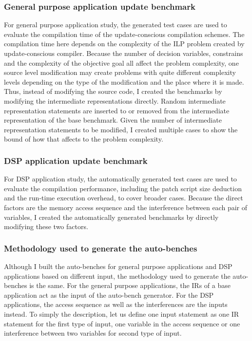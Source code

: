 \subsubsection{General purpose application update benchmark}
For general purpose application study, 
the generated test cases are used to evaluate the compilation time of the update-conscious compilation schemes. The 
compilation time here depends on the complexity of the
ILP problem created by update-conscious compiler.  
Because the number of decision variables, constrains and the complexity of
the objective goal all affect the problem complexity, one source level modification may create problems with
quite different complexity levels depending on the type of the modification
and the place where it is made. 
Thus, instead of modifying the source code, I created the benchmarks
by modifying the intermediate representations directly.
Random intermediate representation statements are inserted to or removed from the 
intermediate representation of the base benchmark.
Given the number of intermediate representation statements to be modified,
I created multiple cases to show the bound of how that affects to the problem complexity.

\subsubsection{DSP application update benchmark}
For DSP application study, the automatically generated test cases are used to evaluate
the compilation performance, including the patch script size deduction and
the run-time execution overhead, to cover broader cases.
Because the direct factors are the memory access sequence and the interference
between each pair of variables, I created the automatically generated 
benchmarks by directly modifying these two factors.

\subsubsection{Methodology used to generate the auto-benches}
Although I built the auto-benches for general purpose applications and DSP applications
based on different input, the methodology used to generate the auto-benches is the same.
For the general purpose applications, the IRs of a base application act as the input of
the auto-bench generator. 
For the DSP applications, the access sequence as well as the interferences
are the inputs instead.
To simply the description, let us define one input statement as one IR statement for the first type of input, 
one variable in the access sequence or one interference between
two variables for second type of input.


